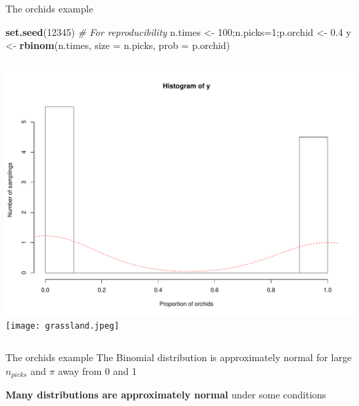 \documentclass[
  ignorenonframetext,
]{beamer}
\newenvironment{Shaded}{\begin{snugshade}}{\end{snugshade}}
\newcommand{\AttributeTok}[1]{\textcolor[rgb]{0.13,0.29,0.53}{#1}}
\newcommand{\CommentTok}[1]{\textcolor[rgb]{0.56,0.35,0.01}{\textit{#1}}}
\newcommand{\DecValTok}[1]{\textcolor[rgb]{0.00,0.00,0.81}{#1}}
\newcommand{\FloatTok}[1]{\textcolor[rgb]{0.00,0.00,0.81}{#1}}
\newcommand{\FunctionTok}[1]{\textcolor[rgb]{0.13,0.29,0.53}{\textbf{#1}}}
\newcommand{\NormalTok}[1]{#1}
\newcommand{\OtherTok}[1]{\textcolor[rgb]{0.56,0.35,0.01}{#1}}
\newcommand{\columnsbegin}{\begin{columns}}
\newcommand{\columnsend}{\end{columns}}
\begin{document}
\begin{frame}[fragile]{The orchids example}
\label{the-orchids-example-1}
\begin{codebox}

\begin{Shaded}
\begin{Highlighting}[]
\FunctionTok{set.seed}\NormalTok{(}\DecValTok{12345}\NormalTok{) }\CommentTok{\# For reproducibility}
\NormalTok{n.times }\OtherTok{\textless{}{-}} \DecValTok{100}\NormalTok{;n.picks}\OtherTok{=}\DecValTok{1}\NormalTok{;p.orchid }\OtherTok{\textless{}{-}} \FloatTok{0.4}
\NormalTok{y }\OtherTok{\textless{}{-}} \FunctionTok{rbinom}\NormalTok{(n.times, }\AttributeTok{size =}\NormalTok{ n.picks, }\AttributeTok{prob =}\NormalTok{ p.orchid) }
\end{Highlighting}
\end{Shaded}

\end{codebox}

\columnsbegin
{}

\includegraphics{IntroLM_files/figure-beamer/unnamed-chunk-4-1.pdf}
 \texttt{[image: grassland.jpeg]} \columnsend
\end{frame}

\begin{frame}{The orchids example}
\label{the-orchids-example-2}
The Binomial distribution is approximately normal for large
\(n_{picks}\) and \(\pi\) away from 0 and 1

\textbf{Many distributions are approximately normal} under some
conditions
\end{frame}
\end{document}
